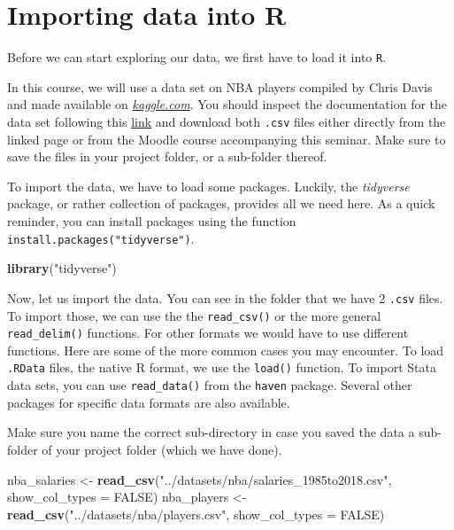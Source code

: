 \documentclass[
]{book}
\newenvironment{Shaded}{\begin{snugshade}}{\end{snugshade}}
\newcommand{\AttributeTok}[1]{\textcolor[rgb]{0.13,0.29,0.53}{#1}}
\newcommand{\ConstantTok}[1]{\textcolor[rgb]{0.56,0.35,0.01}{#1}}
\newcommand{\FunctionTok}[1]{\textcolor[rgb]{0.13,0.29,0.53}{\textbf{#1}}}
\newcommand{\NormalTok}[1]{#1}
\newcommand{\OtherTok}[1]{\textcolor[rgb]{0.56,0.35,0.01}{#1}}
\newcommand{\StringTok}[1]{\textcolor[rgb]{0.31,0.60,0.02}{#1}}
\begin{document}
\hypertarget{importing-data-into-r}{%
\section{Importing data into R}\label{importing-data-into-r}}

Before we can start exploring our data, we first have to load it into \texttt{R}.

In this course, we will use a data set on NBA players compiled by Chris Davis and made available on \href{https://www.kaggle.com/}{\emph{kaggle.com}}. You should inspect the documentation for the data set following this \href{https://www.kaggle.com/datasets/thedevastator/exploring-nba-player-performance-and-salaries-19}{link} and download both \texttt{.csv} files either directly from the linked page or from the Moodle course accompanying this seminar. Make sure to save the files in your project folder, or a sub-folder thereof.

To import the data, we have to load some packages. Luckily, the \emph{tidyverse} package, or rather collection of packages, provides all we need here. As a quick reminder, you can install packages using the function \texttt{install.packages("tidyverse")}.

\begin{Shaded}
\begin{Highlighting}[]
\FunctionTok{library}\NormalTok{(}\StringTok{"tidyverse"}\NormalTok{)}
\end{Highlighting}
\end{Shaded}

Now, let us import the data. You can see in the folder that we have 2 \texttt{.csv} files. To import those, we can use the the \texttt{read\_csv()} or the more general \texttt{read\_delim()} functions. For other formats we would have to use different functions. Here are some of the more common cases you may encounter. To load \texttt{.RData} files, the native R format, we use the \texttt{load()} function. To import Stata data sets, you can use \texttt{read\_data()} from the \texttt{haven} package. Several other packages for specific data formats are also available.

Make sure you name the correct sub-directory in case you saved the data a sub-folder of your project folder (which we have done).

\begin{Shaded}
\begin{Highlighting}[]
\NormalTok{nba\_salaries }\OtherTok{\textless{}{-}} \FunctionTok{read\_csv}\NormalTok{(}\StringTok{"../datasets/nba/salaries\_1985to2018.csv"}\NormalTok{, }\AttributeTok{show\_col\_types =} \ConstantTok{FALSE}\NormalTok{)}
\NormalTok{nba\_players }\OtherTok{\textless{}{-}} \FunctionTok{read\_csv}\NormalTok{(}\StringTok{"../datasets/nba/players.csv"}\NormalTok{, }\AttributeTok{show\_col\_types =} \ConstantTok{FALSE}\NormalTok{)}
\end{Highlighting}
\end{Shaded}
\end{document}
